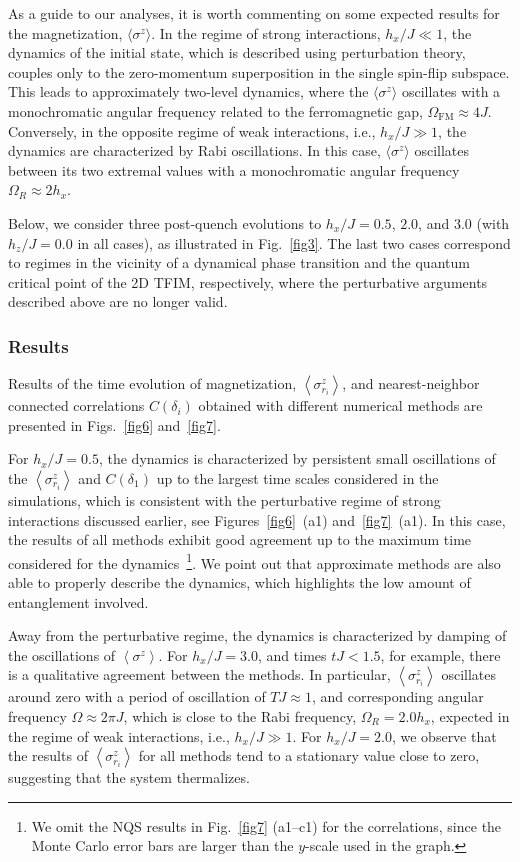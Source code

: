 \documentclass[aps,pra,reprint,amssymb,superscriptaddress]{revtex4-2}
\begin{document}
As a guide to our analyses, it is worth commenting on some expected results for the magnetization, $\langle \sigma^z \rangle$. In the regime of strong interactions, $h_x / J \ll 1$, the dynamics of the initial state, which is described using perturbation theory, couples only to the zero-momentum superposition in the single spin-flip subspace. This leads to approximately two-level dynamics, where the  $\langle \sigma^z \rangle$ oscillates with a monochromatic angular frequency related to the ferromagnetic gap, $\Omega_{\text{FM}} \approx 4J$.
Conversely, in the opposite regime of weak interactions, i.e., $h_x / J \gg 1$, the dynamics are characterized by Rabi oscillations. In this case, $\langle \sigma^z \rangle$ oscillates between its two extremal values with a monochromatic angular frequency $\Omega_{R} \approx 2h_x$.

Below, we consider three post-quench evolutions to $h_x / J = 0.5$, $2.0$, and $3.0$ (with $h_z / J = 0.0$ in all cases), as illustrated in Fig.~\ref{fig3}. The last two cases correspond to regimes in the vicinity of a dynamical phase transition and the quantum critical point of the 2D TFIM, respectively, where the perturbative arguments described above are no longer valid.


\subsubsection{Results}

Results of the time evolution of magnetization, $\left< \sigma^z_{r_i} \right>$, and nearest-neighbor connected correlations $C(\delta_i)$ obtained with different numerical methods are presented in Figs.~\ref{fig6} and~\ref{fig7}.

For $h_x/J = 0.5$, the dynamics is characterized by persistent small oscillations of the $\left< \sigma^z_{r_i} \right>$ and $C(\delta_1)$ up to the largest time scales considered in the simulations, which is consistent with the perturbative regime of strong interactions discussed earlier, see Figures~\ref{fig6}~(a1) and~\ref{fig7}~(a1). In this case, the results of all methods exhibit good agreement up to the maximum time considered for the dynamics~\footnote{We omit the NQS results in Fig.~\ref{fig7} (a1--c1) for the correlations, since the Monte Carlo error bars are larger than the $y$-scale used in the graph.}. We point out that approximate methods are also able to properly describe the dynamics, which highlights the low amount of entanglement involved. 

Away from the perturbative regime, the dynamics is  characterized by damping of the oscillations of $\left< \sigma^z \right>$.
For $h_x/J=3.0$, and times $tJ < 1.5$, for example, there is a qualitative agreement between the methods. In particular, $\left< \sigma^z_{r_i} \right>$ oscillates around zero with a period of  oscillation of $ T J \approx 1$, and corresponding angular frequency $\Omega \approx 2 \pi J $, which is close to the Rabi frequency, $\Omega_{R} = 2.0 h_x$, expected in the regime of weak interactions, i.e., $h_x / J \gg 1$.
For $h_x/J=2.0$, we observe that the results of $\left< \sigma^z_{r_i} \right>$ for all methods tend to a stationary value close to zero, suggesting that the system thermalizes.
\end{document}
